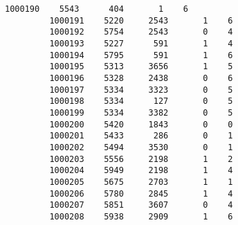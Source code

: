 \documentclass[11pt]{article}
\begin{document}
\begin{Verbatim}[commandchars=\\\{\}]
         1000190    5543      404       1    6   
         1000191    5220     2543       1    6   
         1000192    5754     2543       0    4   
         1000193    5227      591       1    4   
         1000194    5795      591       1    6   
         1000195    5313     3656       1    5   
         1000196    5328     2438       0    6   
         1000197    5334     3323       0    5   
         1000198    5334      127       0    5   
         1000199    5334     3382       0    5   
         1000200    5420     1843       0    0   
         1000201    5433      286       0    1   
         1000202    5494     3530       0    1   
         1000203    5556     2198       1    2   
         1000204    5949     2198       1    4   
         1000205    5675     2703       1    1   
         1000206    5780     2845       1    4   
         1000207    5851     3607       0    4   
         1000208    5938     2909       1    6   
         

\end{Verbatim}
\end{document}
